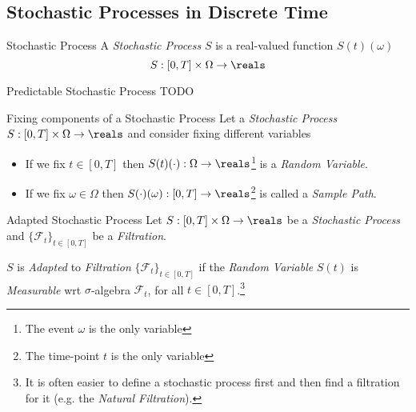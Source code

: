 \documentclass[11pt,a4paper]{article}
\begin{document}
\subsection{Stochastic Processes in Discrete Time}

  \begin{definition}{Stochastic Process}
    A \textit{Stochastic Process} $S$ is a real-valued function $S(t)(\omega)$
    \[ S:[0,T]\times\Omega\to\reals \]
  \end{definition}

  \begin{definition}{Predictable Stochastic Process}
    TODO
  \end{definition}

  \begin{proposition}{Fixing components of a Stochastic Process}
    Let a \textit{Stochastic Process} $S:[0,T]\times\Omega\to\reals$ and consider fixing different variables
    \begin{itemize}
      \item If we fix $t\in[0,T]$ then $S(t)(\cdot):\Omega\to\reals$\footnote{The event $\omega$ is the only variable} is a \textit{Random Variable}.
      \item If we fix $\omega\in\Omega$ then $S(\cdot)(\omega):[0,T]\to\reals$\footnote{The time-point $t$ is the only variable} is called a \textit{Sample Path}.
    \end{itemize}
  \end{proposition}

  \begin{definition}{Adapted Stochastic Process}
    Let $S:[0,T]\times\Omega\to\reals$ be a \textit{Stochastic Process} and $\{\mathcal{F}_t\}_{t\in[0,T]}$ be a \textit{Filtration}.
    \par $S$ is \textit{Adapted} to \textit{Filtration} $\{\mathcal{F}_t\}_{t\in[0,T]}$ if the \textit{Random Variable} $S(t)$ is \textit{Measurable} wrt $\sigma$-algebra $\mathcal{F}_t$, for all $t\in[0,T]$.\footnote{It is often easier to define a stochastic process first and then find a filtration for it (e.g. the \textit{Natural Filtration}).}
  \end{definition}
\end{document}
